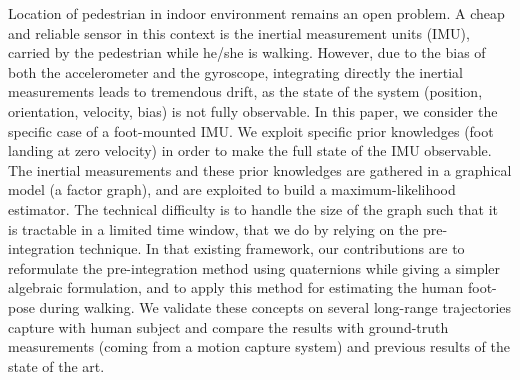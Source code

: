 %
%
Location of pedestrian in indoor environment remains an open problem.
A cheap and reliable sensor in this context is the inertial measurement units (IMU), carried by the pedestrian while he/she is walking.
However, due to the bias of both the accelerometer and the gyroscope, integrating directly the inertial measurements leads to tremendous drift, as the state of the system (position, orientation, velocity, bias) is not fully observable. 
In this paper, we consider the specific case of a foot-mounted IMU.
We exploit specific prior knowledges (foot landing at zero velocity) in order to make the full state of the IMU observable.
The inertial measurements and these prior knowledges are gathered in a graphical model (a factor graph), and are exploited to build a maximum-likelihood estimator.
The technical difficulty is to handle the size of the graph such that it is tractable in a limited time window, that we do by relying on the pre-integration technique.
In that existing framework, our contributions are to reformulate the pre-integration method using quaternions while giving a simpler algebraic formulation, and to apply this method for estimating the human foot-pose during walking.
We validate these concepts on several long-range trajectories capture with human subject and compare the results with ground-truth measurements (coming from a motion capture system) and previous results of the state of the art.



